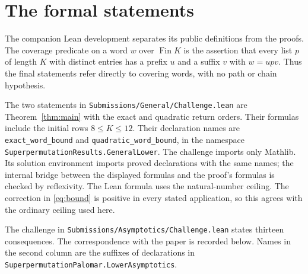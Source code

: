 \section{The formal statements}

The companion Lean development separates its public definitions from
the proofs. The coverage predicate on a word $w$ over $\operatorname{Fin}K$
is the assertion that every list $p$ of length $K$ with distinct entries
has a prefix $u$ and a suffix $v$ with $w=upv$. Thus the final statements
refer directly to covering words, with no path or chain hypothesis.

The two statements in
\nolinkurl{Submissions/General/Challenge.lean}
are Theorem~\ref{thm:main} with the exact and quadratic return orders.
Their formulas include the initial rows $8\le K\le12$.
Their declaration names are \nolinkurl{exact_word_bound} and
\nolinkurl{quadratic_word_bound}, in the namespace
\nolinkurl{SuperpermutationResults.GeneralLower}.
The challenge imports only Mathlib. Its solution environment imports
proved declarations with the same names; the internal bridge between
the displayed formulas and the proof's formulas is checked by reflexivity.
The Lean formula uses the natural-number ceiling. The correction in
\eqref{eq:bound} is positive in every stated application, so this
agrees with the ordinary ceiling used here.

The challenge in \nolinkurl{Submissions/Asymptotics/Challenge.lean}
states thirteen consequences. The correspondence
with the paper is recorded below. Names in the second column are the
suffixes of declarations in
\nolinkurl{SuperpermutationPalomar.LowerAsymptotics}.

